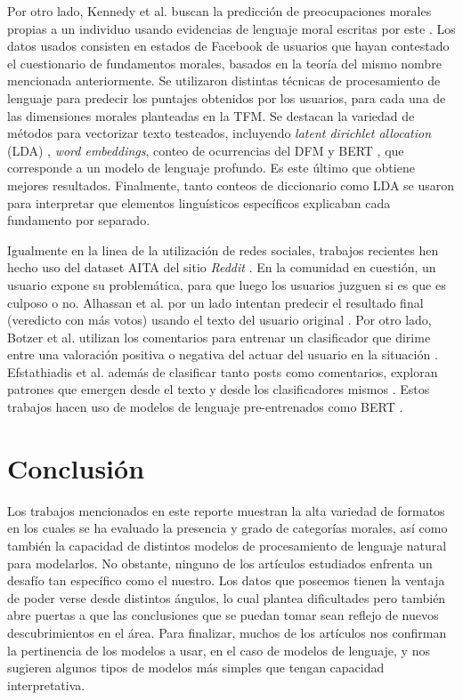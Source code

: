 \documentclass[
	spanish, %
	letterpaper, oneside
]{article}
\begin{document}
\newp Por otro lado, Kennedy et al. buscan la predicción de preocupaciones morales propias a un individuo usando evidencias de lenguaje moral escritas por este \cite{diff}. Los datos usados consisten en estados de Facebook de usuarios que hayan contestado el cuestionario de fundamentos morales, basados en la teoría del mismo nombre mencionada anteriormente. Se utilizaron distintas técnicas de procesamiento de lenguaje para predecir los puntajes obtenidos por los usuarios, para cada una de las dimensiones morales planteadas en la TFM. Se destacan la variedad de métodos para vectorizar texto testeados, incluyendo \textit{latent dirichlet allocation} (LDA) \cite{lda}, \textit{word embeddings}, conteo de ocurrencias del DFM \cite{tfd} y BERT \cite{bert}, que corresponde a un modelo de lenguaje profundo. Es este último que obtiene mejores resultados. Finalmente, tanto conteos de diccionario como LDA se usaron para interpretar que elementos linguísticos específicos explicaban cada fundamento por separado.

\newp Igualmente en la linea de la utilización de redes sociales, trabajos recientes hen hecho uso del dataset AITA del sitio \textit{Reddit} \cite{aita}. En la comunidad en cuestión, un usuario expone su problemática, para que luego los usuarios juzguen si es que es culposo o no. Alhassan et al. por un lado intentan predecir el resultado final (veredicto con más votos) usando el texto del usuario original \cite{alh}. Por otro lado, Botzer et al. utilizan los comentarios para entrenar un clasificador que dirime entre una valoración positiva o negativa del actuar del usuario en la situación \cite{botzer}. Efstathiadis et al. además de clasificar tanto posts como comentarios, exploran patrones que emergen desde el texto y desde los clasificadores mismos \cite{Efs}. Estos trabajos hacen uso de modelos de lenguaje pre-entrenados como BERT \cite{bert}.


\section{Conclusión}

Los trabajos mencionados en este reporte muestran la alta variedad de formatos en los cuales se ha evaluado la presencia y grado de categorías morales, así como también la capacidad de distintos modelos de procesamiento de lenguaje natural para modelarlos. No obstante, ninguno de los artículos estudiados enfrenta un desafío tan específico como el nuestro. Los datos que poseemos tienen la ventaja de poder verse desde distintos ángulos, lo cual plantea dificultades pero también abre puertas a que las conclusiones que se puedan tomar sean reflejo de nuevos descubrimientos en el área. Para finalizar, muchos de los artículos nos confirman la pertinencia de los modelos a usar, en el caso de modelos de lenguaje, y nos sugieren algunos tipos de modelos más simples que tengan capacidad interpretativa.
\end{document}
